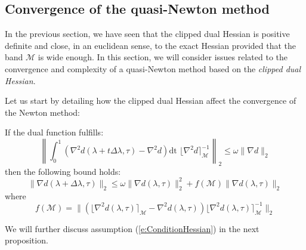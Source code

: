 \subsection{Convergence of the quasi-Newton method}

In the previous section, we have seen that the clipped dual Hessian is positive definite and close, in an euclidean sense, to the exact Hessian provided that the band $\mathcal{M}$ is wide enough. In this section, we will consider issues related to the convergence and complexity of a quasi-Newton method based on the \emph{clipped dual Hessian}.

Let us start by detailing how the clipped dual Hessian affect the convergence of the Newton method:
\begin{theorem} If the dual function fulfills:
\begin{equation} \label{e:ConditionHessian}
\left\| \int_0^1 ( \nabla^2 d(\lambda + t \Delta \lambda, \tau) - \nabla^2 d ) \text{dt } \lfloor \nabla^2 d \rceil_{\mathcal{M}}^{-1} \right\|_2 \leq \omega \| \nabla d \|_2
\end{equation}
then the following bound holds:
\begin{equation} \label{e:Convergence}
\| \nabla d(\lambda + \Delta \lambda,\tau) \|_2 \leq \omega \| \nabla d(\lambda, \tau) \|_2^2 + f(\mathcal{M}) \| \nabla d(\lambda, \tau) \|_2
\end{equation}
where
\begin{equation}
f(\mathcal{M}) = \| (\lfloor \nabla^2 d(\lambda, \tau) \rceil_{\mathcal{M}} - \nabla^2 d(\lambda,\tau) ) \lfloor \nabla^2 d(\lambda, \tau) \rceil_{\mathcal{M}}^{-1} \|_2
\end{equation}
\end{theorem}
\begin{remark}
We will further discuss assumption (\ref{e:ConditionHessian}) in the next proposition.
\end{remark}
